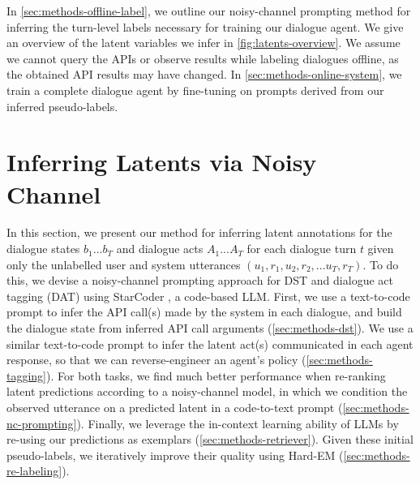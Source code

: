 \documentclass[11pt]{article}
\newcommand{\jmf}[1]{}
\begin{document}
In \autoref{sec:methods-offline-label}, we outline our noisy-channel prompting method for inferring the turn-level labels necessary for training our dialogue agent. We give an overview of the latent variables we infer in \autoref{fig:latents-overview}. We assume we cannot query the APIs or observe results while labeling dialogues offline, as the obtained API results may have changed.
In \autoref{sec:methods-online-system}, we train a complete dialogue agent by fine-tuning on prompts derived from our inferred pseudo-labels.


\section{Inferring Latents via Noisy Channel}
\label{sec:methods-offline-label}

In this section, we present our method for inferring latent annotations for the dialogue states $b_1...b_T$\jmf{API calls?} and dialogue acts $A_1...A_T$ for each dialogue turn $t$ given only the unlabelled user and system utterances $(u_1, r_1, u_2, r_2, ... u_T, r_T)$.
To do this, we devise a noisy-channel prompting approach for DST and dialogue act tagging (DAT) using StarCoder \cite{li2023starcoder}, a code-based LLM.
First, we use a text-to-code prompt to infer the API call(s) made by the system in each dialogue, and build the dialogue state from inferred API call arguments (\autoref{sec:methods-dst}).
We use a similar text-to-code prompt to infer the latent act(s) communicated in each agent response, so that we can reverse-engineer an agent's policy (\autoref{sec:methods-tagging}).
For both tasks, we find much better performance when re-ranking latent predictions according to a noisy-channel model, in which we condition the observed utterance on a predicted latent in a code-to-text prompt (\autoref{sec:methods-nc-prompting}).
Finally, we leverage the in-context learning ability of LLMs by re-using our predictions as exemplars (\autoref{sec:methods-retriever}).
Given these initial pseudo-labels, we iteratively improve their quality using Hard-EM \cite{dempster_maximum_1977_fixed} (\autoref{sec:methods-re-labeling}).
\end{document}
